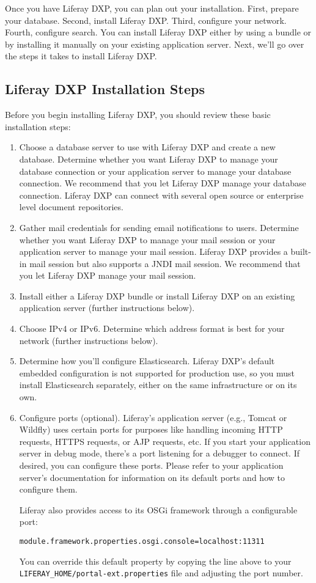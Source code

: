 Once you have Liferay DXP, you can plan out your installation. First,
prepare your database. Second, install Liferay DXP. Third, configure
your network. Fourth, configure search. You can install Liferay DXP
either by using a bundle or by installing it manually on your existing
application server. Next, we'll go over the steps it takes to install
Liferay DXP.

\subsection{Liferay DXP Installation
Steps}\label{liferay-dxp-installation-steps}

Before you begin installing Liferay DXP, you should review these basic
installation steps:

\begin{enumerate}
\def\labelenumi{\arabic{enumi}.}
\item
  Choose a database server to use with Liferay DXP and create a new
  database. Determine whether you want Liferay DXP to manage your
  database connection or your application server to manage your database
  connection. We recommend that you let Liferay DXP manage your database
  connection. Liferay DXP can connect with several open source or
  enterprise level document repositories.
\item
  Gather mail credentials for sending email notifications to users.
  Determine whether you want Liferay DXP to manage your mail session or
  your application server to manage your mail session. Liferay DXP
  provides a built-in mail session but also supports a JNDI mail
  session. We recommend that you let Liferay DXP manage your mail
  session.
\item
  Install either a Liferay DXP bundle or install Liferay DXP on an
  existing application server (further instructions below).
\item
  Choose IPv4 or IPv6. Determine which address format is best for your
  network (further instructions below).
\item
  Determine how you'll configure Elasticsearch. Liferay DXP's default
  embedded configuration is not supported for production use, so you
  must install Elasticsearch separately, either on the same
  infrastructure or on its own.
\item
  Configure ports (optional). Liferay's application server (e.g., Tomcat
  or Wildfly) uses certain ports for purposes like handling incoming
  HTTP requests, HTTPS requests, or AJP requests, etc. If you start your
  application server in debug mode, there's a port listening for a
  debugger to connect. If desired, you can configure these ports. Please
  refer to your application server's documentation for information on
  its default ports and how to configure them.

  Liferay also provides access to its OSGi framework through a
  configurable port:

  \texttt{module.framework.properties.osgi.console=localhost:11311}

  You can override this default property by copying the line above to
  your \texttt{LIFERAY\_HOME/portal-ext.properties} file and adjusting
  the port number.
\end{enumerate}

